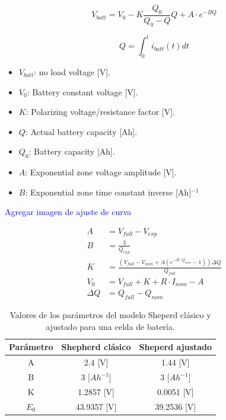 \begin{equation}
    V_{batt} = V_0 -K\frac{Q_0}{Q_0-Q}Q + A\cdot e^{-BQ}
\label{eq:Voc}
\end{equation}

\begin{equation}
    Q = \int_0^t i_{batt}(t)dt
\end{equation}

\begin{itemize}
    \item $V_{batt}$: no load voltage [V].
    \item $V_{0}$: Battery constant voltage [V].
    \item $K$: Polarizing voltage/resistance factor [V].
    \item $Q$: Actual battery capacity [Ah].
    \item $Q_{0}$: Battery capacity [Ah].
    \item $A$: Exponential zone voltage amplitude [V].
    \item $B$: Exponential zone time constant inverse [Ah]${}^{-1}$
\end{itemize}

\textcolor{blue}{Agregar imagen de ajuste de curva}

\begin{equation}
\begin{split}
    A &= V_{full}-V_{exp}\\
    B &= \frac{3}{Q_{exp}}\\
    K &= \frac{(V_{full}-V_{nom}+A (e^{-B\cdot Q_{nom}}-1)) \Delta Q}{Q_{full}}\\
   V_0 &= V_{full} + K + R\cdot I_{nom} - A\\
    \Delta Q &=Q_{full}-Q_{nom}
\end{split}
\label{ecuaciones}
\end{equation}



\begin{table}[h]
\centering
\caption{Valores de los parámetros del modelo Sheperd clásico y ajustado para una celda de batería.}
\label{table3}
\begin{tabular}{c|c|c}\hline
Parámetro& Shepherd clásico & Sheperd ajustado\\ \hline \hline 
A& 2.4 [V]& 1.44 [V]\\
B & 3 [$Ah^{-1}$] & 3 [$Ah^{-1}$]\\
K & 1.2857 [V]& 0.0051 [V]\\
$E_0$ & 43.9357 [V]& 39.2536 [V]\\
\hline \hline
\end{tabular}
\end{table}



